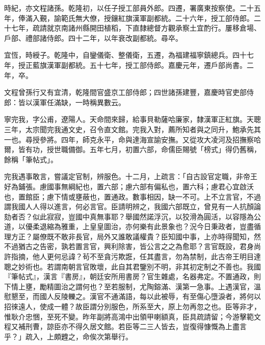 \begin{pinyinscope}
時紀，亦文程諸孫。乾隆初，以任子授工部員外郎。四遷，署廣東按察使。二十五年，俸滿入覲，諭範氏無大僚，授鑲紅旗漢軍副都統。二十六年，授工部侍郎。二十七年，疏請就京南諸州縣開田植稻，下直隸總督方觀承察土宜酌行。屢移倉場、戶部、禮部諸侍郎。四十二年，以年衰改副都統。尋卒。

宜恆，時綬子。乾隆中，自鑾儀衛、整儀衛，五遷，為福建福寧鎮總兵。四十七年，授正藍旗漢軍副都統。五十七年，授工部侍郎。嘉慶元年，遷戶部尚書。二年，卒。

文程曾孫行又有宜清，乾隆間官盛京工部侍郎；四世諸孫建豐，嘉慶時官吏部侍郎：皆以漢軍任滿缺，一時稱異數云。

寧完我，字公甫，遼陽人。天命間來歸，給事貝勒薩哈廉家，隸漢軍正紅旗。天聰三年，太宗聞完我通文史，召令直文館。完我入對，薦所知者與之同升，鮑承先其一也。尋授參將。四年，師克永平，命與達海宣諭安撫。又從攻大凌河及招撫察哈爾，皆有功，授世職備御。五年七月，初置六部，命儒臣賜號「榜式」得仍舊稱，餘稱「筆帖式」。

完我遇事敢言，嘗議定官制，辨服色。十二月，上疏言：「自古設官定職，非帝王好為鋪張。慮國事無綱紀也，置六部；慮六部有偏私也，置六科；慮君心宜啟沃也，置館臣；慮下情或壅蔽也，置通政。數事相因，缺一不可。上不立言官，不過謂我國人人得以進言，何必言官。臣請明辨之，我國六部既立，曾見有一人抗顏論劾者否？似此寂寂，豈國中真無事耶？舉國然諾浮沉，以狡滑為圓活，以容隱為公道，以優柔退縮為雅重，上皇皇圖治，亦何樂有此景象也？況今日秉政者，豈盡循理方正？屬僚既不敢非長官，局外又誰敢議權貴？臣知國中事，上亦時得聞知，然不過猶古之告密，孰若置言官，興利除害，皆公言之之為愈耶？言官既設，君身尚許指摘，他人更何忌諱？茍不至貪污欺誑，任其盡言，勿為禁制，此古帝王明目達聰之妙術也。若謂南朝言官敗壞，此自其君鑒別不明，非其初定制之不善也。我國『筆帖式』，漢言『書房』，朝廷安所用書房？官生雜處，名器弗定。不置通政，則下情上壅，勵精圖治之謂何也？至若服制，尤陶鎔滿、漢第一急事。上遇漢官，溫慰懇至，而國人反陵轢之。漢官不通滿語，每以此被辱，有至傷心墮淚者，將何以招徠遠人，使成一體？故臣謂分別服色，所系至大，原上勿再忽之也。臣等非才，惟耿介忠悃，至死不變。昨年副將高鴻中出領甲喇額真，臣具疏請留；今游擊範文程又補刑曹，諒臣亦不得久居文館。若臣等二三人皆去，豈復得慷慨為上盡言乎？」疏入，上頗韙之，命俟次第舉行。


\end{pinyinscope}
